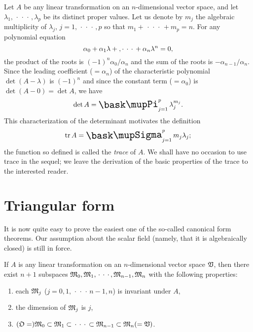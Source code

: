 Let \(A\) be any linear transformation on an \(n\)-dimensional vector space, and
let \(\lambda_1, \,\cdot\,\cdot\,\cdot\,, \lambda_p\) be its distinct proper
values. Let us denote by \(m_j\) the algebraic multiplicity of \(\lambda_j\),
\(j = 1, \,\cdot\,\cdot\,\cdot\,, p\) so that \(m_1 + \,\cdot\,\cdot\,\cdot\, +
m_p = n\). For any polynomial equation
\begin{equation*}
    \alpha_0 + \alpha_1 \lambda + \\,\cdot\,\cdot\,\cdot\, + \alpha_n \lambda^n
    = 0,
\end{equation*}
the product of the roots is \((-1)^n\alpha_0/\alpha_n\) and the sum of the roots
is \(-\alpha_{n-1}/\alpha_n\). Since the leading coefficient (\(= \alpha_n\)) of
the characteristic polynomial \(\det (A - \lambda)\) is \((-1)^n\) and since the
constant term (\(=\alpha_0\)) is \(\det(A-0) = \det A\), we have
\begin{equation*}
    \det A = \prodx_{j=1}^p \lambda_j^{m_j}.
\end{equation*}
This characterization of the determinant motivates the definition
\begin{equation*}
    \trace{A} = \sumx_{j=1}^p m_j \lambda_j;
\end{equation*}
the function so defined is called the \emph{trace} of \(A\). We shall have no
occasion to use trace in the sequel; we leave the derivation of the basic
properties of the trace to the interested reader.

\section{Triangular form}

It is now quite easy to prove the easiest one of the so-called canonical form
theorems. Our assumption about the scalar field (namely, that it is
algebraically closed) is still in force.

\begin{theorem}
    If \(A\) is any linear transformation on an \(n\)-dimensional vector space
    \(\mathfrak{V}\), then there exist \(n + 1\) subspaces \(\frak{M}_0, \frak{M}_1,
    \,\cdot\,\cdot\,\cdot\,, \frak{M}_{n-1}, \frak{M}_n\) with the following
    properties:
    \begin{enumerate}[wide, nosep, label=(\roman*)]
        \item each \(\frak{M}_j\) (\(j= 0, 1, \,\cdot\,\cdot\,\cdot\, n-1, n\))
        is invariant under \(A\),
        \item the dimension of \(\frak{M}_j\) is \(j\),
        \item \((\frak{O} = ) \frak{M}_0 \subset \frak{M}_1 \subset
        \,\cdot\,\cdot\,\cdot\, \subset \frak{M}_{n-1} \subset \frak{M}_n (=
        \mathfrak{V})\).
    \end{enumerate}
\end{theorem}



